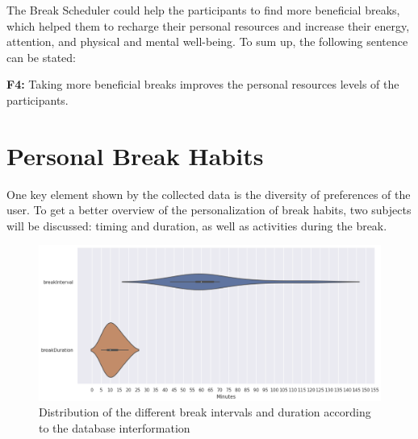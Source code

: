 \documentclass{hasel_thesis}
\begin{document}
The Break Scheduler could help the participants to find more beneficial breaks, which helped them to recharge their personal resources and increase their energy, attention, and physical and mental well-being. To sum up, the following sentence can be stated:

\begin{tcolorbox}[colback=white!5!white,colframe=black!75!black]
 \textbf{F4:} Taking more beneficial breaks improves the personal resources levels of the participants.
\end{tcolorbox}


\section{Personal Break Habits} \label{personal_break_habits}

One key element shown by the collected data is the diversity of preferences of the user. To get a better overview of the personalization of break habits, two subjects will be discussed: timing and duration, as well as activities during the break.


\begin{figure}[htp]
    \centering
    \includegraphics[width=14cm]{hasel_thesis/images/break_Interval_Duration.png}
    \caption{Distribution of the different break intervals and duration according to the database interformation}
    \label{fig:interval_duration}
\end{figure}
\end{document}
